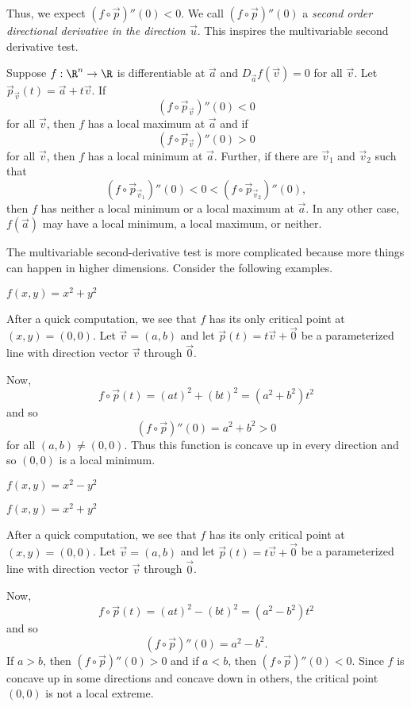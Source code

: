 Thus, we expect $(f\circ \vec p)''(0) < 0$.  We call $(f\circ \vec p)''(0)$ a
\emph{second order directional derivative in the direction $\vec u$}.  This inspires
the multivariable second derivative test.

\begin{theorem}
	Suppose $f:\R^n\to\R$ is differentiable at $\vec a$ and
	$D_{\vec a} f(\vec v)=0$ for all $\vec v$.  Let $\vec p_{\vec v}(t) = \vec a+t\vec v$.
	If 
	\[
		(f\circ \vec p_{\vec v})''(0) < 0
	\]
	for all $\vec v$, then $f$ has a local maximum at $\vec a$ and if
	\[
		(f\circ \vec p_{\vec v})''(0) > 0
	\]
	for all $\vec v$, then $f$ has a local minimum at $\vec a$.  Further, if
	there are $\vec v_1$ and $\vec v_2$ such that
	\[
		(f\circ \vec p_{\vec v_1})''(0) < 0 < (f\circ \vec p_{\vec v_2})''(0),
	\]
	then $f$ has neither a local minimum or a local maximum at $\vec a$.  In any
	other case, $f(\vec a)$ may have a local minimum, a local maximum, or neither.
\end{theorem}

The multivariable second-derivative test is more complicated because more
things can happen in higher dimensions.  Consider the following examples.

\begin{example}
	$f(x,y)=x^2+y^2$

	After a quick computation, we see that $f$ has its only critical
	point at $(x,y)=(0,0)$.  Let $\vec v=(a,b)$ and let $\vec p(t) = t\vec v+\vec 0$
	be a parameterized line with direction vector $\vec v$ through $\vec 0$.

	Now,
	\[
		f\circ \vec p(t) = (at)^2+(bt)^2=(a^2+b^2)t^2
	\]
	and so
	\[
		(f\circ \vec p)''(0) = a^2+b^2 > 0
	\]
	for all $(a,b)\neq(0,0)$.  Thus this function is concave up in every
	direction and so $(0,0)$ is a local minimum.
\end{example}

\begin{example}
	$f(x,y)=x^2-y^2$

	$f(x,y)=x^2+y^2$

	After a quick computation, we see that $f$ has its only critical
	point at $(x,y)=(0,0)$.  Let $\vec v=(a,b)$ and let $\vec p(t) = t\vec v+\vec 0$
	be a parameterized line with direction vector $\vec v$ through $\vec 0$.

	Now,
	\[
		f\circ \vec p(t) = (at)^2-(bt)^2=(a^2-b^2)t^2
	\]
	and so
	\[
		(f\circ \vec p)''(0) = a^2-b^2.
	\]
	If $a>b$, then $(f\circ \vec p)''(0)>0$ and if $a<b$, then 
	$(f\circ \vec p)''(0)<0$.  Since $f$ is concave up in some directions
	and concave down in others, the critical point $(0,0)$ is not a local extreme.
\end{example}

